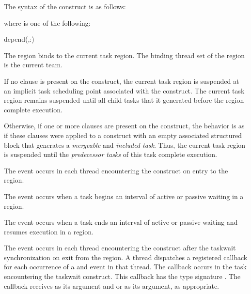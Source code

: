\begin{fortranspecific}
The syntax of the  construct is as follows:


where  is one of the following:

\begin{indentedcodelist}
depend(\plc{[depend-modifier},\plc{]dependence-type }:)
\end{indentedcodelist}

\end{fortranspecific}

\binding
The  region binds to the current task region. The binding thread set of the
 region is the current team.

\descr

If no  clause is present on the  construct, the
current task region is suspended at an implicit task scheduling point
associated with the construct. The current task region remains suspended until
all child tasks that it generated before the  region complete
execution.

Otherwise, if one or more  clauses are present on the
 construct, the behavior is as if these clauses were applied to
a  construct with an empty associated structured block that
generates a \emph{mergeable} and \emph{included task}. Thus, the current task region is
suspended until the \emph{predecessor tasks} of this task complete execution.

\events
The  event occurs in each thread encountering the
 construct on entry to the  region.

The  event occurs when a task begins an interval of active or passive waiting
in a  region.

The  event occurs when a task ends an interval of active or passive waiting
and resumes execution in a  region.

The  event occurs in each thread encountering the
 construct after the taskwait synchronization on exit from the
 region.
\tools
A thread dispatches a registered 
callback for each occurrence of a  and  event
in that thread.  The callback occurs in the task encountering
the taskwait construct.  This callback has the type signature
.
The callback receives
 as its  argument and
 or 
as its  argument, as appropriate.

